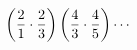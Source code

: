 \documentclass[preview]{standalone}
\begin{document}
\begin{align*}
\left( {2 \over 1} \cdot {2 \over 3} \right) \left( {4 \over 3} \cdot {4 \over 5} \right) \cdots
\end{align*}
\end{document}
